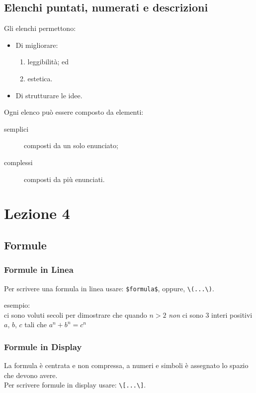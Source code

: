 \documentclass{report}
\begin{document}
        \section{Elenchi puntati, numerati e descrizioni}
            Gli elenchi permettono:
            \begin{itemize}
                \item Di migliorare:
                \begin{enumerate}
                    \item leggibilità; ed
                    \item estetica.
                \end{enumerate}
                \item Di strutturare le idee.
            \end{itemize} 
            Ogni elenco può essere
            composto da elementi:
            \begin{description}
                \item [semplici] composti da un solo enunciato;
                \item [complessi] composti da più enunciati.
            \end{description}


    \chapter{Lezione 4}

            \section{Formule}
                \subsection{Formule in Linea}
                    Per scrivere una formula in linea usare: \verb!$formula$!, oppure, \verb!\(...\)!.

                    esempio: \\
                        ci sono voluti secoli per dimostrare che quando $n > 2$ \emph{non} ci sono 
                        3 interi positivi $a$, $b$, $c$ tali che $a^n+b^n=c ^n$

                \subsection{Formule in Display}
                    La formula è centrata e non compressa, a numeri e simboli è
                    assegnato lo spazio che devono avere. \\
                    Per scrivere formule in display usare: \verb!\[...\]!.
                    
\end{document}
